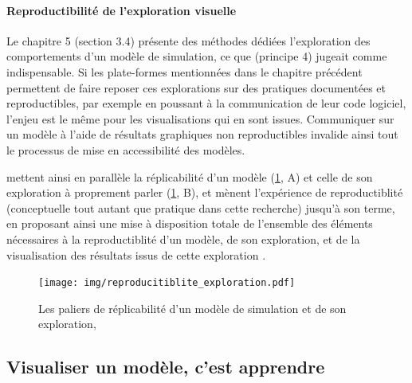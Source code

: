 \documentclass[a4paper, 12pt]{article}
\begin{document}
\paragraph{Reproductibilité de l'exploration visuelle}

Le chapitre 5 (section 3.4) présente des méthodes dédiées l'exploration des comportements d'un modèle de simulation, ce que \textcite{banos_pour_2013} (principe 4) jugeait comme indispensable.
Si les plate-formes mentionnées dans le chapitre précédent permettent de faire reposer ces explorations sur des pratiques documentées et reproductibles, par exemple en poussant à la communication de leur code logiciel, l'enjeu est le même pour les visualisations qui en sont issues.
Communiquer sur un modèle à l'aide de résultats graphiques non reproductibles invalide ainsi tout le processus de mise en accessibilité des modèles.

 mettent ainsi en parallèle la réplicabilité d'un modèle (\cref{fig:paliers-replicabilite}, A) et celle de son exploration à proprement parler (\cref{fig:paliers-replicabilite}, B), et mènent l'expérience de reproductiblité (conceptuelle tout autant que pratique dans cette recherche) jusqu'à son terme, en proposant ainsi une mise à disposition totale de l'ensemble des éléments nécessaires à la reproductiblité d'un modèle, de son exploration, et de la visualisation des résultats issus de cette exploration \autocite[\ppno~429--433]{reycoyrehourcq:hal-01677950}.

\begin{figure}[H]
	\texttt{[image: img/reproducitiblite\_exploration.pdf]}
	\caption{\og Les paliers de réplicabilité d'un modèle de simulation et de son exploration\fg{}, \cite[fig.~3, p.~427]{reycoyrehourcq:hal-01677950}}
	\label{fig:paliers-replicabilite}
\end{figure}


 \subsection{Visualiser un modèle, c'est apprendre\label{visualiser-apprendre}}
 
\end{document}
